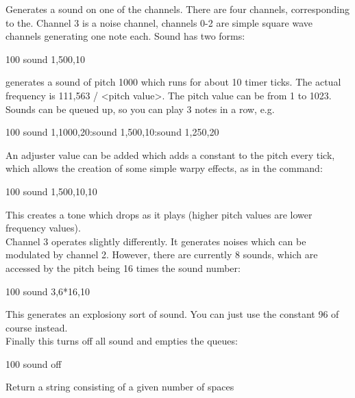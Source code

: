 \begin{entry}

Generates a sound on one of the channels. There are four channels, corresponding to the. Channel 3 is a noise channel, channels 0-2 are simple square wave channels generating one note each.
Sound has two forms:

\begin{lstexample}
100 sound 1,500,10
\end{lstexample}

generates a sound of pitch 1000 which runs for about 10 timer ticks. The actual frequency is 111,563 / <pitch value>. The pitch value can be from 1 to 1023. Sounds can be queued up, so you can play 3 notes in a row, e.g.


\begin{lstexample}
100 sound 1,1000,20:sound 1,500,10:sound 1,250,20
\end{lstexample}

An adjuster value can be added which adds a constant to the pitch every tick, which allows the creation of some simple warpy effects, as in the  command:


\begin{lstexample}
100 sound 1,500,10,10
\end{lstexample}

This creates a tone which drops as it plays (higher pitch values are lower frequency values). \\

Channel 3 operates slightly differently. It generates noises which can be modulated by channel 2. However, there are currently 8 sounds, which are accessed by the pitch being 16 times the sound number:

\begin{lstexample}
100 sound 3,6*16,10
\end{lstexample}

This generates an explosiony sort of sound. You can just use the constant 96 of course instead.\\

Finally this turns off all sound and empties the queues:

\begin{lstexample}
100 sound off
\end{lstexample}
\end{entry}

\begin{entry}
Return a string consisting of a given number of spaces


\end{entry}

